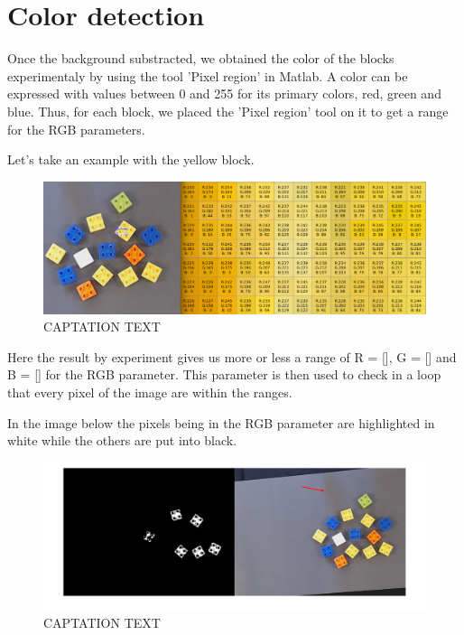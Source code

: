 \section{Color detection}

 	Once the background substracted, we obtained the color of the blocks experimentaly by using the tool 'Pixel region' in Matlab. A color can be expressed with values between 0 and 255 for its primary colors, red, green and blue. Thus, for each block, we placed the 'Pixel region' tool on it to get a range for the RGB parameters.\par
\begin{flushleft}
Let's take an example with the yellow block.
\end{flushleft} \par

\begin{figure}[hb]
  \centering
  \includegraphics[scale=0.3]{figures/Thres_Y_manualy2.png}
  \caption[LABEL] {CAPTATION TEXT}
\end{figure}

Here the result by experiment gives us more or less a range of R = [], G = [] and B = [] for the RGB parameter. This parameter is then used to check in a loop that every pixel of the image are within the ranges.\par
In the image below the pixels being in the RGB parameter are highlighted in white while the others are put into black. 

\begin{figure}[hb]
  \centering
  \includegraphics[scale=0.3]{figures/Thres_Y_bad2.png}
  \caption[LABEL] {CAPTATION TEXT}
\end{figure}
  
